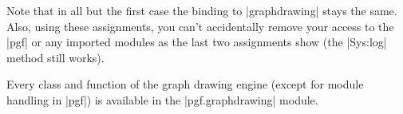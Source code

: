 Note that in all but the first case the binding to |graphdrawing|
stays the same.  Also, using these assignments, you can't accidentally
remove your access to the |pgf| or any imported modules as the last
two assignments show (the |Sys:log| method still works).

Every class and function of the graph drawing engine (except for
module handling in |pgf|) is available in the |pgf.graphdrawing|
module. 


